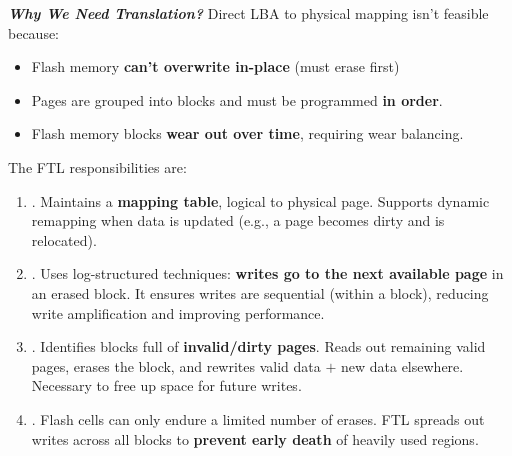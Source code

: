 \highspace
\textcolor{Green3}{ \textbf{\emph{Why We Need Translation?}}} Direct LBA to physical mapping isn't feasible because:
\begin{itemize}[label=\textcolor{Red2}{}]
    \item Flash memory \textbf{can't overwrite in-place} (must erase first)
    \item Pages are grouped into blocks and must be programmed \textbf{in order}.
    \item Flash memory blocks \textbf{wear out over time}, requiring wear balancing.
\end{itemize}
The FTL responsibilities are:
\begin{enumerate}
    \item {}. Maintains a \textbf{mapping table}, logical to physical page. Supports dynamic remapping when data is updated (e.g., a page becomes dirty and is relocated).
    \item {}. Uses log-structured techniques: \textbf{writes go to the next available page} in an erased block. It ensures writes are sequential (within a block), reducing write amplification and improving performance.
    \item {}. Identifies blocks full of \textbf{invalid/dirty pages}. Reads out remaining valid pages, erases the block, and rewrites valid data $+$ new data elsewhere. Necessary to free up space for future writes.
    \item {}. Flash cells can only endure a limited number of erases. FTL spreads out writes across all blocks to \textbf{prevent early death} of heavily used regions.
\end{enumerate}

